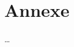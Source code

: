 \documentclass[
    iict, %
    il, %
]{heig-tb}
\begin{document}


\chapter{Annexe}
\dots


\end{document}
